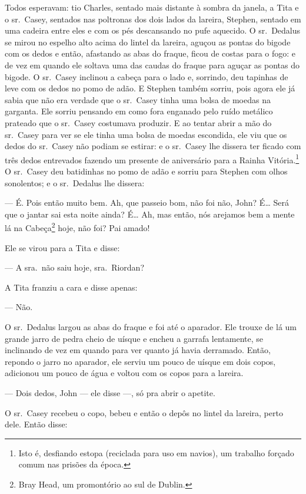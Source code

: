 Todos esperavam: tio Charles, sentado mais distante à sombra da janela,
a Tita e o sr.~Casey, sentados nas poltronas dos dois lados da lareira, 
Stephen, sentado em uma cadeira entre eles e com os pés descansando no
pufe aquecido. O sr.~Dedalus se mirou no espelho alto acima do lintel
da lareira, aguçou as pontas do bigode com os dedos e então, afastando
as abas do fraque, ficou de costas para o fogo: e de vez em quando ele
soltava uma das caudas do fraque para aguçar as pontas do bigode. O sr.~Casey 
inclinou a cabeça para o lado e, sorrindo, deu tapinhas de leve
com os dedos no pomo de adão. E Stephen também sorriu, pois agora ele
já sabia que não era verdade que o sr.~Casey tinha uma bolsa de moedas
na garganta. Ele sorriu pensando em como fora enganado pelo ruído
metálico prateado que o sr.~Casey costumava produzir. E ao tentar abrir
a mão do sr.~Casey para ver se ele tinha uma bolsa de moedas escondida,
ele viu que os dedos do sr.~Casey não podiam se estirar: e o sr.~Casey
lhe dissera ter ficado com três dedos entrevados fazendo um presente de
aniversário para a Rainha Vitória.\footnote{ Isto é, desfiando estopa
(reciclada para uso em navios), um trabalho forçado comum nas prisões
da época.} O sr.~Casey deu batidinhas no pomo de adão e sorriu para
Stephen com olhos sonolentos; e o sr.~Dedalus lhe dissera:

--- É. Pois então muito bem. Ah, que passeio bom, não foi não, John? É\ldots{}
Será que o jantar sai esta noite ainda? É\ldots{} Ah, mas então, nós
arejamos bem a mente lá na Cabeça\footnote{ Bray Head, um promontório
ao sul de Dublin.} hoje, não foi? Pai amado!

Ele se virou para a Tita e disse:

 --- A sra.~não saiu hoje, sra.~Riordan?

A Tita franziu a cara e disse apenas:

 --- Não.

O sr.~Dedalus largou as abas do fraque e foi até o aparador. Ele trouxe
de lá um grande jarro de pedra cheio de uísque e encheu a garrafa
lentamente, se inclinando de vez em quando para ver quanto já havia
derramado. Então, repondo o jarro no aparador, ele serviu um pouco de
uísque em dois copos, adicionou um pouco de água e voltou com os copos
para a lareira.

 --- Dois dedos, John --- ele disse ---, só pra abrir o apetite.

O sr.~Casey recebeu o copo, bebeu e então o depôs no lintel da lareira,
perto dele. Então disse:

